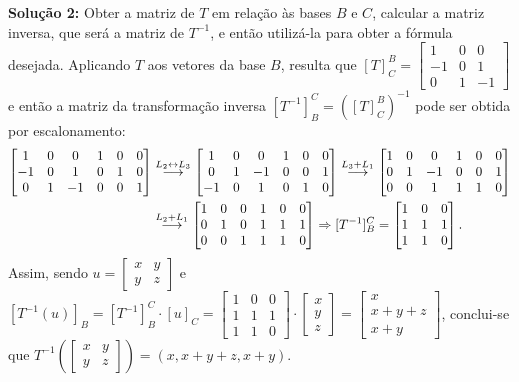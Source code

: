 \documentclass[12pt,a4paper]{article}
\newcommand{\grstep}[2][\relax]{%
   \ensuremath{\mathrel{
       {\mathop{\longrightarrow}\limits^{#2\mathstrut}_{
                                     \begin{subarray}{l} #1 \end{subarray}}}}}}
\newcommand{\swap}{\leftrightarrow}
\begin{document}
\begin{ExerciseList}
\begin{enumerate}
\textbf{Solução 2:} Obter a matriz de $T$ em relação às bases $B$ e $C$, calcular a matriz inversa, que será a matriz de $T^{-1}$, e então utilizá-la para obter a fórmula desejada. Aplicando $T$ aos vetores da base $B$, resulta que $
[T]^B_C = \begin{bmatrix}
 1 & 0 & 0\\
-1 & 0 & 1\\
 0 & 1 & -1
\end{bmatrix}$ e então a matriz da transformação inversa $[T^{-1}]^C_B = ([T]^B_C)^{-1}$ pode ser obtida por escalonamento:
\begin{align*}
\begin{bmatrix}
 1 & 0 &  0 & 1 & 0 & 0\\
-1 & 0 &  1 & 0 & 1 & 0\\
 0 & 1 & -1 & 0 & 0 & 1
\end{bmatrix}
& \grstep{ L_2 \swap L_3 }
\begin{bmatrix}
 1 & 0 &  0 & 1 & 0 & 0\\
 0 & 1 & -1 & 0 & 0 & 1\\
-1 & 0 &  1 & 0 & 1 & 0
\end{bmatrix}
\grstep{ L_3+L_1 }
\begin{bmatrix}
1 & 0 &  0 & 1 & 0 & 0\\
0 & 1 & -1 & 0 & 0 & 1\\
0 & 0 &  1 & 1 & 1 & 0
\end{bmatrix} \\
& \grstep{ L_2+L_1 }
\begin{bmatrix}
1 & 0 & 0 & 1 & 0 & 0\\
0 & 1 & 0 & 1 & 1 & 1\\
0 & 0 & 1 & 1 & 1 & 0
\end{bmatrix}
\Rightarrow
[T^{-1}]^C_B = \begin{bmatrix}
1 & 0 & 0\\
1 & 1 & 1\\
1 & 1 & 0
\end{bmatrix}.
\end{align*}
Assim, sendo $u=
\begin{bmatrix}
x & y\\
y & z
\end{bmatrix}$ e $[T^{-1}(u)]_B = [T^{-1}]^C_B \cdot [u]_C = \begin{bmatrix}
1 & 0 & 0\\
1 & 1 & 1\\
1 & 1 & 0
\end{bmatrix}
\cdot
\begin{bmatrix}
x\\
y\\
z
\end{bmatrix}
=
\begin{bmatrix}
x\\
x+y+z\\
x+y
\end{bmatrix}$, conclui-se que $T^{-1}\left(
\begin{bmatrix}
x & y\\
y & z
\end{bmatrix}\right) = (x,x+y+z,x+y)$.
\end{enumerate}
\end{ExerciseList}
\end{document}
